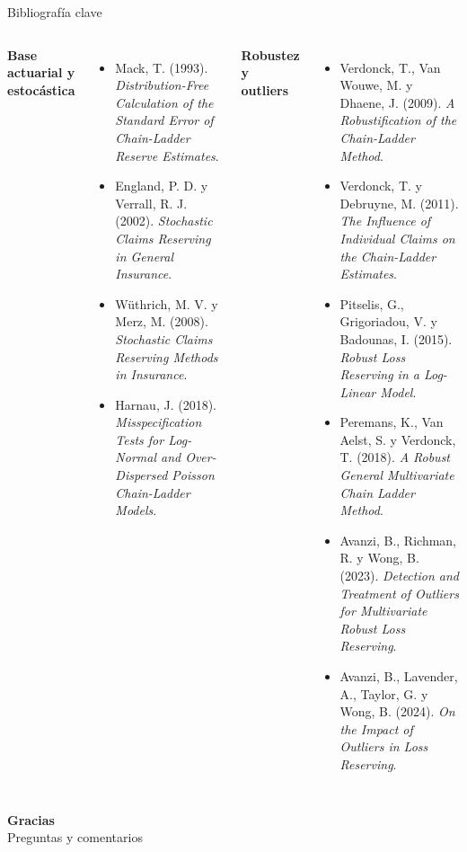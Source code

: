 \documentclass[10pt,aspectratio=169]{beamer}
\begin{document}
\begin{frame}{Bibliografía clave}
    \scriptsize
    \begin{columns}[T]
        \textbf{\color{ustaNavy}Base actuarial y estocástica}
        \begin{itemize}
            \item Mack, T. (1993). \textit{Distribution-Free Calculation of the Standard Error of Chain-Ladder Reserve Estimates}.
            \item England, P. D. y Verrall, R. J. (2002). \textit{Stochastic Claims Reserving in General Insurance}.
            \item Wüthrich, M. V. y Merz, M. (2008). \textit{Stochastic Claims Reserving Methods in Insurance}.
            \item Harnau, J. (2018). \textit{Misspecification Tests for Log-Normal and Over-Dispersed Poisson Chain-Ladder Models}.
        \end{itemize}

        \textbf{\color{ustaNavy}Robustez y outliers}
        \begin{itemize}
            \item Verdonck, T., Van Wouwe, M. y Dhaene, J. (2009). \textit{A Robustification of the Chain-Ladder Method}.
            \item Verdonck, T. y Debruyne, M. (2011). \textit{The Influence of Individual Claims on the Chain-Ladder Estimates}.
            \item Pitselis, G., Grigoriadou, V. y Badounas, I. (2015). \textit{Robust Loss Reserving in a Log-Linear Model}.
            \item Peremans, K., Van Aelst, S. y Verdonck, T. (2018). \textit{A Robust General Multivariate Chain Ladder Method}.
            \item Avanzi, B., Richman, R. y Wong, B. (2023). \textit{Detection and Treatment of Outliers for Multivariate Robust Loss Reserving}.
            \item Avanzi, B., Lavender, A., Taylor, G. y Wong, B. (2024). \textit{On the Impact of Outliers in Loss Reserving}.
        \end{itemize}
    \end{columns}
\end{frame}

\begin{frame}
    \centering
    {\Large\color{ustaNavy}\textbf{Gracias}}\\[0.45cm]
    Preguntas y comentarios
\end{frame}
\end{document}
